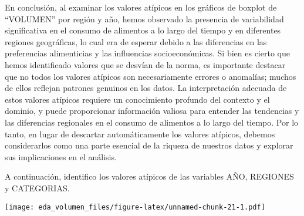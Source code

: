 \documentclass[
]{article}
\newenvironment{Shaded}{\begin{snugshade}}{\end{snugshade}}
\newcommand{\AttributeTok}[1]{\textcolor[rgb]{0.13,0.29,0.53}{#1}}
\newcommand{\CommentTok}[1]{\textcolor[rgb]{0.56,0.35,0.01}{\textit{#1}}}
\newcommand{\DecValTok}[1]{\textcolor[rgb]{0.00,0.00,0.81}{#1}}
\newcommand{\FloatTok}[1]{\textcolor[rgb]{0.00,0.00,0.81}{#1}}
\newcommand{\FunctionTok}[1]{\textcolor[rgb]{0.13,0.29,0.53}{\textbf{#1}}}
\newcommand{\NormalTok}[1]{#1}
\newcommand{\SpecialCharTok}[1]{\textcolor[rgb]{0.81,0.36,0.00}{\textbf{#1}}}
\newcommand{\StringTok}[1]{\textcolor[rgb]{0.31,0.60,0.02}{#1}}
\begin{document}
En conclusión, al examinar los valores atípicos en los gráficos de
boxplot de ``VOLUMEN'' por región y año, hemos observado la presencia de
variabilidad significativa en el consumo de alimentos a lo largo del
tiempo y en diferentes regiones geográficas, lo cual era de esperar
debido a las diferencias en las preferencias alimenticias y las
influencias socioeconómicas. Si bien es cierto que hemos identificado
valores que se desvían de la norma, es importante destacar que no todos
los valores atípicos son necesariamente errores o anomalías; muchos de
ellos reflejan patrones genuinos en los datos. La interpretación
adecuada de estos valores atípicos requiere un conocimiento profundo del
contexto y el dominio, y puede proporcionar información valiosa para
entender las tendencias y las diferencias regionales en el consumo de
alimentos a lo largo del tiempo. Por lo tanto, en lugar de descartar
automáticamente los valores atípicos, debemos considerarlos como una
parte esencial de la riqueza de nuestros datos y explorar sus
implicaciones en el análisis.

A continuación, identifico los valores atípicos de las variables AÑO,
REGIONES y CATEGORIAS.

\begin{Shaded}
\end{Shaded}

\texttt{[image: eda\_volumen\_files/figure-latex/unnamed-chunk-21-1.pdf]}
\end{document}
